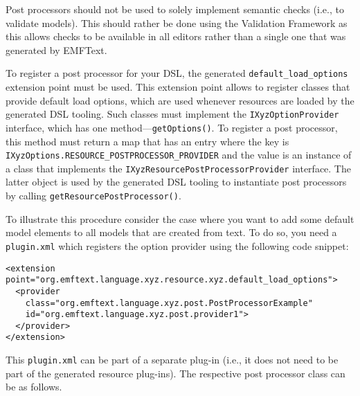 Post processors should not be used to solely implement semantic checks (i.e.,
to validate models). This should rather be done using the \EMF Validation
Framework as this allows checks to be available in all editors rather than a
single one that was generated by EMFText.

To register a post processor for your DSL, the generated 
\texttt{default\_load\_options} extension point must be used. This extension
point allows to register classes that provide default load options, which are
used whenever resources are loaded by the generated DSL tooling. Such classes
must implement the \texttt{IXyzOptionProvider} interface, which has one
method---\texttt{getOptions()}. To register a post processor, this method must
return a map that has an entry where the key is
\texttt{IXyzOptions.RESOURCE\_POSTPROCESSOR\_PROVIDER} and the value is an
instance of a class that implements the
\texttt{IXyzResourcePostProcessorProvider} interface. The latter object is used
by the generated DSL tooling to instantiate post processors by calling
\texttt{getResourcePostProcessor()}.

To illustrate this procedure consider the case where you want to add some
default model elements to all models that are created from text. To do so, you
need a \texttt{plugin.xml} which registers the option provider using the
following code snippet:

\lstset{language=XML}
\begin{lstlisting}
<extension point="org.emftext.language.xyz.resource.xyz.default_load_options">
  <provider
    class="org.emftext.language.xyz.post.PostProcessorExample"
    id="org.emftext.language.xyz.post.provider1">
  </provider>
</extension>
\end{lstlisting}

This \texttt{plugin.xml} can be part of a separate plug-in (i.e., it does not
need to be part of the generated resource plug-ins). The respective post
processor class can be as follows.

